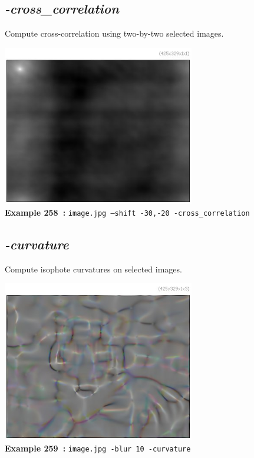 \documentclass[a4paper,11pt,twoside]{book}
\begin{document}
\subsection{\emph{-cross\_correlation} }\vspace*{-0.5em}
Compute cross-correlation using two-by-two selected images.
\begin{center}\includegraphics[keepaspectratio=true,height=7cm,width=\textwidth]{img/gmic_def258.jpg}\\
{\footnotesize \textbf{Example 258~:} \texttt{image.jpg --shift -30,-20 -cross\_correlation}}
\end{center}

\subsection{\emph{-curvature} }\vspace*{-0.5em}
Compute isophote curvatures on selected images.
\begin{center}\includegraphics[keepaspectratio=true,height=7cm,width=\textwidth]{img/gmic_def259.jpg}\\
{\footnotesize \textbf{Example 259~:} \texttt{image.jpg -blur 10 -curvature}}
\end{center}
\end{document}
